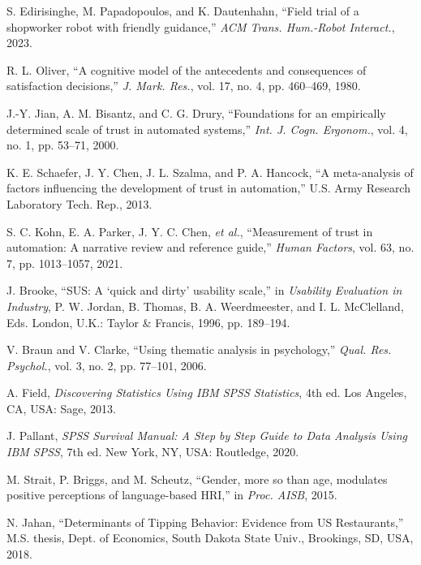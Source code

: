 \documentclass[conference]{IEEEtran}
\begin{document}
\begin{thebibliography}{35}
 S. Edirisinghe, M. Papadopoulos, and K. Dautenhahn, “Field trial of a shopworker robot with friendly guidance,” \textit{ACM Trans. Hum.-Robot Interact.}, 2023.

 R. L. Oliver, “A cognitive model of the antecedents and consequences of satisfaction decisions,” \textit{J. Mark. Res.}, vol. 17, no. 4, pp. 460–469, 1980.

 J.-Y. Jian, A. M. Bisantz, and C. G. Drury, “Foundations for an empirically determined scale of trust in automated systems,” \textit{Int. J. Cogn. Ergonom.}, vol. 4, no. 1, pp. 53–71, 2000.

 K. E. Schaefer, J. Y. Chen, J. L. Szalma, and P. A. Hancock, “A meta-analysis of factors influencing the development of trust in automation,” U.S. Army Research Laboratory Tech. Rep., 2013.

 S. C. Kohn, E. A. Parker, J. Y. C. Chen, \textit{et al.}, “Measurement of trust in automation: A narrative review and reference guide,” \textit{Human Factors}, vol. 63, no. 7, pp. 1013–1057, 2021.

 J. Brooke, “SUS: A ‘quick and dirty’ usability scale,” in \textit{Usability Evaluation in Industry}, P. W. Jordan, B. Thomas, B. A. Weerdmeester, and I. L. McClelland, Eds. London, U.K.: Taylor \& Francis, 1996, pp. 189–194.

 V. Braun and V. Clarke, “Using thematic analysis in psychology,” \textit{Qual. Res. Psychol.}, vol. 3, no. 2, pp. 77–101, 2006.

 A. Field, \textit{Discovering Statistics Using IBM SPSS Statistics}, 4th ed. Los Angeles, CA, USA: Sage, 2013.

 J. Pallant, \textit{SPSS Survival Manual: A Step by Step Guide to Data Analysis Using IBM SPSS}, 7th ed. New York, NY, USA: Routledge, 2020.

 M. Strait, P. Briggs, and M. Scheutz, “Gender, more so than age, modulates positive perceptions of language-based HRI,” in \textit{Proc. AISB}, 2015.

 N. Jahan, “Determinants of Tipping Behavior: Evidence from US Restaurants,” M.S. thesis, Dept. of Economics, South Dakota State Univ., Brookings, SD, USA, 2018.


\end{thebibliography}
\end{document}
